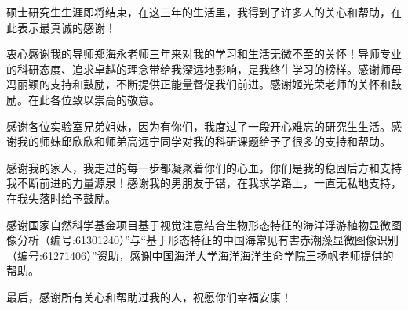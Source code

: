 
\begin{ack}
  硕士研究生生涯即将结束，在这三年的生活里，我得到了许多人的关心和帮助，在此表示最真诚的感谢！

衷心感谢我的导师郑海永老师三年来对我的学习和生活无微不至的关怀！导师专业的科研态度、追求卓越的理念带给我深远地影响，是我终生学习的榜样。感谢师母冯丽颖的支持和鼓励，不断提供正能量督促我们前进。感谢姬光荣老师的关怀和鼓励。在此各位致以崇高的敬意。

感谢各位实验室兄弟姐妹，因为有你们，我度过了一段开心难忘的研究生生活。感谢我的师妹邱欣欣和师弟高远宁同学对我的科研课题给予了很多的支持和帮助。

感谢我的家人，我走过的每一步都凝聚着你们的心血，你们是我的稳固后方和支持我不断前进的力量源泉！感谢我的男朋友于锴，在我求学路上，一直无私地支持，在我失落时给予鼓励。

感谢国家自然科学基金项目基于视觉注意结合生物形态特征的海洋浮游植物显微图像分析（编号:61301240）”与“基于形态特征的中国海常见有害赤潮藻显微图像识别（编号:61271406）”资助，感谢中国海洋大学海洋海洋生命学院王扬帆老师提供的帮助。

最后，感谢所有关心和帮助过我的人，祝愿你们幸福安康！
\end{ack}
